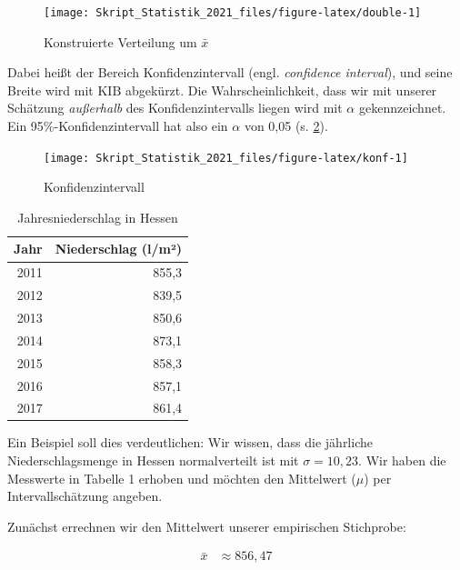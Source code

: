 \documentclass[
  11pt,
  ngerman,
  a4paper,
]{report}
\begin{document}
\begin{figure}[!h]

{\centering \texttt{[image: Skript\_Statistik\_2021\_files/figure-latex/double-1]} 

}

\caption{Konstruierte Verteilung um $\bar{x}$}\label{fig:double}
\end{figure}

Dabei heißt der Bereich Konfidenzintervall (engl. \emph{confidence interval}), und seine Breite wird mit \(\textrm{KIB}\) abgekürzt. Die Wahrscheinlichkeit, dass wir mit unserer Schätzung \emph{außerhalb} des Konfidenzintervalls liegen wird mit \(\alpha\) gekennzeichnet. Ein 95\%-Konfidenzintervall hat also ein \(\alpha\) von 0,05 (s. \ref{fig:konf}).

\begin{figure}[!h]

{\centering \texttt{[image: Skript\_Statistik\_2021\_files/figure-latex/konf-1]} 

}

\caption{Konfidenzintervall}\label{fig:konf}
\end{figure}

\begin{table}

\caption{\label{tab:tab}Jahresniederschlag in Hessen}
\centering
\begin{tabular}[t]{rr}
\toprule
Jahr & Niederschlag (l/m²)\\
\midrule
2011 & 855,3\\
2012 & 839,5\\
2013 & 850,6\\
2014 & 873,1\\
2015 & 858,3\\
2016 & 857,1\\
2017 & 861,4\\
\bottomrule
\end{tabular}
\end{table}

Ein Beispiel soll dies verdeutlichen: Wir wissen, dass die jährliche Niederschlagsmenge in Hessen normalverteilt ist mit \(\sigma=10{,}23\). Wir haben die Messwerte in Tabelle 1 erhoben und möchten den Mittelwert (\(\mu\)) per Intervallschätzung angeben.

Zunächst errechnen wir den Mittelwert unserer empirischen Stichprobe:

\nopagebreak

\[
\begin{aligned}
  \bar{x}&\approx856{,}47
\end{aligned}
\]
\end{document}
